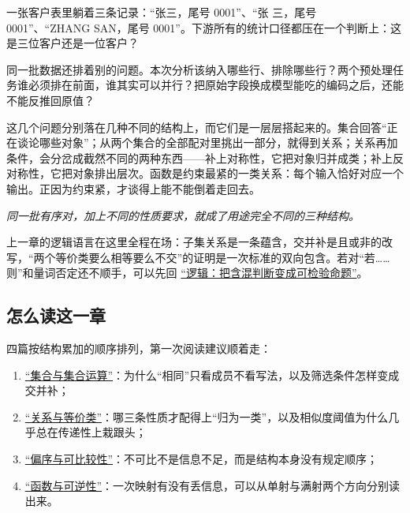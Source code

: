 一张客户表里躺着三条记录：``张三，尾号 0001''、``张 三，尾号 0001''、``ZHANG SAN，尾号 0001''。下游所有的统计口径都压在一个判断上：这是三位客户还是一位客户？

同一批数据还排着别的问题。本次分析该纳入哪些行、排除哪些行？两个预处理任务谁必须排在前面，谁其实可以并行？把原始字段换成模型能吃的编码之后，还能不能反推回原值？

这几个问题分别落在几种不同的结构上，而它们是一层层搭起来的。集合回答``正在谈论哪些对象''；从两个集合的全部配对里挑出一部分，就得到关系；关系再加条件，会分岔成截然不同的两种东西——补上对称性，它把对象归并成类；补上反对称性，它把对象排出层次。函数是约束最紧的一类关系：每个输入恰好对应一个输出。正因为约束紧，才谈得上能不能倒着走回去。

\begin{center}

\emph{同一批有序对，加上不同的性质要求，就成了用途完全不同的三种结构。}
\end{center}

上一章的逻辑语言在这里全程在场：子集关系是一条蕴含，交并补是且或非的改写，``两个等价类要么相等要么不交''的证明是一次标准的双向包含。若对``若……则''和量词否定还不顺手，可以先回 \hyperref[ch:004]{``逻辑：把含混判断变成可检验命题''}。

\subsection{怎么读这一章}

四篇按结构累加的顺序排列，第一次阅读建议顺着走：

\begin{enumerate}
\tightlist
\item \hyperref[sec:01-Mathematical-Language/02-Sets-Relations-Functions/01]{``集合与集合运算''}：为什么``相同''只看成员不看写法，以及筛选条件怎样变成交并补；
\item \hyperref[sec:01-Mathematical-Language/02-Sets-Relations-Functions/02]{``关系与等价类''}：哪三条性质才配得上``归为一类''，以及相似度阈值为什么几乎总在传递性上栽跟头；
\item \hyperref[sec:01-Mathematical-Language/02-Sets-Relations-Functions/03]{``偏序与可比较性''}：不可比不是信息不足，而是结构本身没有规定顺序；
\item \hyperref[sec:01-Mathematical-Language/02-Sets-Relations-Functions/04]{``函数与可逆性''}：一次映射有没有丢信息，可以从单射与满射两个方向分别读出来。
\end{enumerate}

